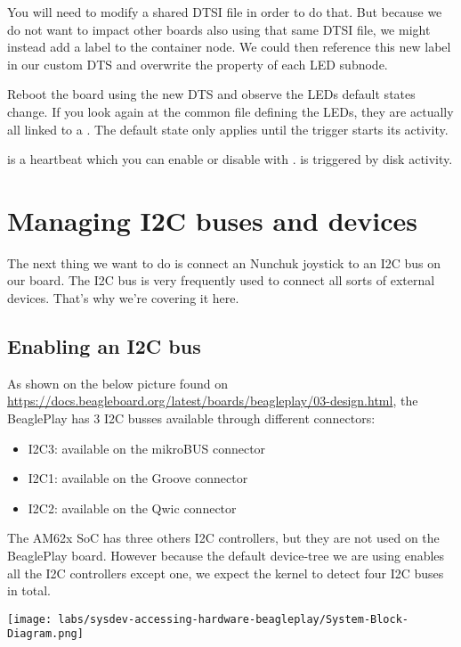 You will need to modify a shared DTSI file in order to do that. But
because we do not want to impact other boards also using that same DTSI
file, we might instead add a label to the  container node. We
could then reference this new label in our custom DTS and overwrite the
 property of each LED subnode.

Reboot the board using the new DTS and observe the LEDs default states change.
If you look again at the common file defining the LEDs, they are actually all
linked to a . The default state only applies until
the trigger starts its activity.

 is a heartbeat which you can enable or disable with
.  is triggered by disk
activity.

\section{Managing I2C buses and devices}

The next thing we want to do is connect an Nunchuk joystick
to an I2C bus on our board. The I2C bus is very frequently used
to connect all sorts of external devices. That's why we're covering
it here.

\subsection{Enabling an I2C bus}

As shown on the below picture found on
\url{https://docs.beagleboard.org/latest/boards/beagleplay/03-design.html}, the
BeaglePlay has 3 I2C busses available through different connectors:

\begin{itemize}
\item I2C3: available on the mikroBUS connector
\item I2C1: available on the Groove connector
\item I2C2: available on the Qwic connector
\end{itemize}

The AM62x SoC has three others I2C controllers, but they are not used on the
BeaglePlay board. However because the default device-tree we are using enables
all the I2C controllers except one, we expect the kernel to detect four I2C
buses in total.

\texttt{[image: labs/sysdev-accessing-hardware-beagleplay/System-Block-Diagram.png]}

